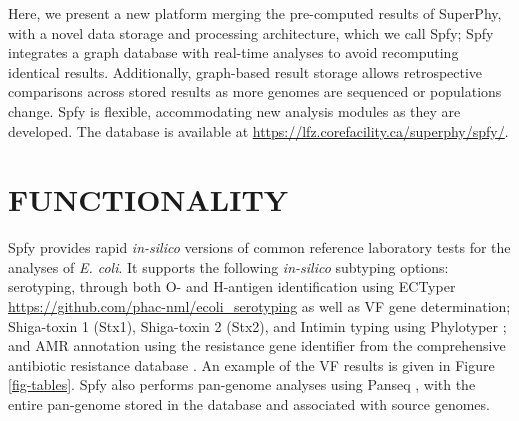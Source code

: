 \documentclass{article}
\begin{document}
Here, we present a new platform merging the pre-computed results of SuperPhy, with a novel data storage and processing architecture, which we call Spfy; Spfy integrates a graph database with real-time analyses to avoid recomputing identical results. Additionally, graph-based result storage allows retrospective comparisons across stored results as more genomes are sequenced or populations change. Spfy is flexible, accommodating new analysis modules as they are developed. The database is available at \url{https://lfz.corefacility.ca/superphy/spfy/}.



\enlargethispage{-65.1pt}



\section{FUNCTIONALITY}


Spfy provides rapid \textit{in-silico} versions of common reference laboratory tests for the analyses of \textit{E. coli}. It supports the following \textit{in-silico} subtyping options: serotyping, through both O- and H-antigen identification using ECTyper \url{https://github.com/phac-nml/ecoli_serotyping} as well as VF gene determination; Shiga-toxin 1 (Stx1), Shiga-toxin 2 (Stx2), and Intimin typing using Phylotyper \cite{whiteside2017phylotyper}; and AMR annotation using the resistance gene identifier from the comprehensive antibiotic resistance database \cite{mcarthur2013comprehensive}. An example of the VF results is given in Figure \ref{fig-tables}. Spfy also performs pan-genome analyses using Panseq \cite{laing2010pan}, with the entire pan-genome stored in the database and associated with source genomes.
\end{document}
